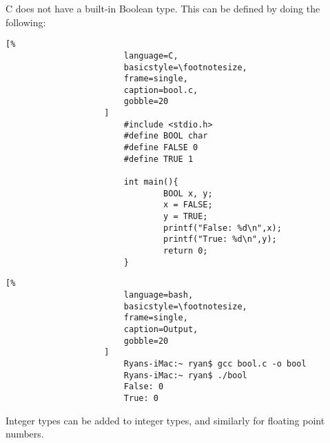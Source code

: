 \documentclass[crop=false,class=book,oneside]{standalone}
\begin{document}
                C does not have a built-in Boolean type. This can be
                defined by doing the following:
                \newline
                \begin{minipage}[t]{.48\textwidth}
                    \centering
                    \begin{lstlisting}[%
                        language=C,
                        basicstyle=\footnotesize,
                        frame=single,
                        caption=bool.c,
                        gobble=20
                    ]
                        #include <stdio.h>
                        #define BOOL char
                        #define FALSE 0
                        #define TRUE 1
                        
                        int main(){
                                BOOL x, y;
                                x = FALSE;
                                y = TRUE;
                                printf("False: %d\n",x);
                                printf("True: %d\n",y);
                                return 0;
                        }
                    \end{lstlisting}
                \end{minipage}\hfill
                \begin{minipage}[t]{.48\textwidth}
                    \centering
                    \begin{lstlisting}[%
                        language=bash,
                        basicstyle=\footnotesize,
                        frame=single,
                        caption=Output,
                        gobble=20
                    ]
                        Ryans-iMac:~ ryan$ gcc bool.c -o bool
                        Ryans-iMac:~ ryan$ ./bool
                        False: 0
                        True: 0
                    \end{lstlisting}
                \end{minipage}
                Integer types can be added to integer types,
                and similarly for floating point numbers.\newline
\end{document}

